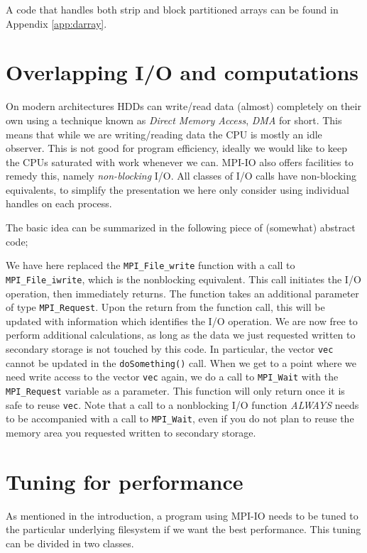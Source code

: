 A code that handles both strip and block partitioned arrays can be found in
Appendix \ref{app:darray}.

\section{Overlapping I/O and computations}

On modern architectures HDDs can write/read data (almost) completely on their
own using a technique known as \emph{Direct Memory Access}, \emph{DMA} for
short. This means that while we are writing/reading data the CPU is mostly an
idle observer. This is not good for program efficiency, ideally we would like to
keep the CPUs saturated with work whenever we can. MPI-IO also offers facilities
to remedy this, namely \emph{non-blocking} I/O. All classes of I/O calls have
non-blocking equivalents, to simplify the presentation we here only consider
using individual handles on each process.

The basic idea can be summarized in the following piece of (somewhat) abstract
code;

We have here replaced the \texttt{MPI\_File\_write} function with a call to
\texttt{MPI\_File\_iwrite}, which is the nonblocking equivalent. This call
initiates the I/O operation, then immediately returns. The function takes an
additional parameter of type \texttt{MPI\_Request}. Upon the return from the
function call, this will be updated with information which identifies the I/O
operation. We are now free to perform additional calculations, as long as the
data we just requested written to secondary storage is not touched by this code.
In particular, the vector \texttt{vec} cannot be updated in the
\texttt{doSomething()} call. When we get to a point where we need write access
to the vector \texttt{vec} again, we do a call to \texttt{MPI\_Wait} with the
\texttt{MPI\_Request} variable as a parameter. This function will only return
once it is safe to reuse \texttt{vec}. Note that a call to a nonblocking I/O
function \emph{ALWAYS} needs to be accompanied with a call to
\texttt{MPI\_Wait}, even if you do not plan to reuse the memory area you
requested written to secondary storage.

\section{Tuning for performance}

As mentioned in the introduction, a program using MPI-IO needs to be tuned to
the particular underlying filesystem if we want the best performance. This
tuning can be divided in two classes.

